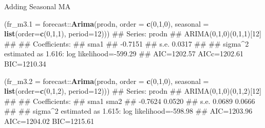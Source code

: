 \documentclass[11pt,ignorenonframetext,]{beamer}
\newenvironment{Shaded}{}{}
\newcommand{\DataTypeTok}[1]{\textcolor[rgb]{0.56,0.13,0.00}{#1}}
\newcommand{\DecValTok}[1]{\textcolor[rgb]{0.25,0.63,0.44}{#1}}
\newcommand{\KeywordTok}[1]{\textcolor[rgb]{0.00,0.44,0.13}{\textbf{#1}}}
\newcommand{\NormalTok}[1]{#1}
\newcommand{\OperatorTok}[1]{\textcolor[rgb]{0.40,0.40,0.40}{#1}}
\let\oldShaded\Shaded
\let\endoldShaded\endShaded
\renewenvironment{Shaded}{\footnotesize\begin{spacing}{0.9}\oldShaded}{\endoldShaded\end{spacing}}
\let\oldverbatim\verbatim
\let\endoldverbatim\endverbatim
\newcommand{\scriptoutput}{
  \renewenvironment{Shaded}{\scriptsize\begin{spacing}{0.9}\oldShaded}{\endoldShaded\end{spacing}}
  \renewenvironment{verbatim}{\scriptsize\begin{spacing}{0.9}\oldverbatim}{\endoldverbatim\end{spacing}}
}
\begin{document}
\begin{frame}[fragile]{%
\protect\hypertarget{adding-seasonal-ma}{%
Adding Seasonal MA}}

\scriptoutput

\begin{Shaded}
\begin{Highlighting}[]
\NormalTok{(}\DataTypeTok{fr_m3.1 =}\NormalTok{ forecast}\OperatorTok{::}\KeywordTok{Arima}\NormalTok{(prodn, }\DataTypeTok{order =} \KeywordTok{c}\NormalTok{(}\DecValTok{0}\NormalTok{,}\DecValTok{1}\NormalTok{,}\DecValTok{0}\NormalTok{), }
            \DataTypeTok{seasonal =} \KeywordTok{list}\NormalTok{(}\DataTypeTok{order=}\KeywordTok{c}\NormalTok{(}\DecValTok{0}\NormalTok{,}\DecValTok{1}\NormalTok{,}\DecValTok{1}\NormalTok{), }\DataTypeTok{period=}\DecValTok{12}\NormalTok{)))}
\NormalTok{## Series: prodn }
\NormalTok{## ARIMA(0,1,0)(0,1,1)[12] }
\NormalTok{## }
\NormalTok{## Coefficients:}
\NormalTok{##          sma1}
\NormalTok{##       -0.7151}
\NormalTok{## s.e.   0.0317}
\NormalTok{## }
\NormalTok{## sigma^2 estimated as 1.616:  log likelihood=-599.29}
\NormalTok{## AIC=1202.57   AICc=1202.61   BIC=1210.34}
\end{Highlighting}
\end{Shaded}

\begin{Shaded}
\begin{Highlighting}[]
\NormalTok{(}\DataTypeTok{fr_m3.2 =}\NormalTok{ forecast}\OperatorTok{::}\KeywordTok{Arima}\NormalTok{(prodn, }\DataTypeTok{order =} \KeywordTok{c}\NormalTok{(}\DecValTok{0}\NormalTok{,}\DecValTok{1}\NormalTok{,}\DecValTok{0}\NormalTok{), }
            \DataTypeTok{seasonal =} \KeywordTok{list}\NormalTok{(}\DataTypeTok{order=}\KeywordTok{c}\NormalTok{(}\DecValTok{0}\NormalTok{,}\DecValTok{1}\NormalTok{,}\DecValTok{2}\NormalTok{), }\DataTypeTok{period=}\DecValTok{12}\NormalTok{)))}
\NormalTok{## Series: prodn }
\NormalTok{## ARIMA(0,1,0)(0,1,2)[12] }
\NormalTok{## }
\NormalTok{## Coefficients:}
\NormalTok{##          sma1    sma2}
\NormalTok{##       -0.7624  0.0520}
\NormalTok{## s.e.   0.0689  0.0666}
\NormalTok{## }
\NormalTok{## sigma^2 estimated as 1.615:  log likelihood=-598.98}
\NormalTok{## AIC=1203.96   AICc=1204.02   BIC=1215.61}
\end{Highlighting}
\end{Shaded}

\end{frame}
\end{document}
